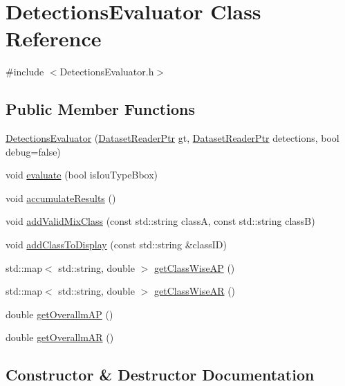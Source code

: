 \hypertarget{class_detections_evaluator}{}\section{Detections\+Evaluator Class Reference}
\label{class_detections_evaluator}


{\ttfamily \#include $<$Detections\+Evaluator.\+h$>$}

\subsection*{Public Member Functions}
\begin{DoxyCompactItemize}
\item 
\hyperlink{class_detections_evaluator_aea7893610a1924fc827b1140f4d64644}{Detections\+Evaluator} (\hyperlink{_dataset_reader_8h_a30d89cba514a220d64d04535c0465f1c}{Dataset\+Reader\+Ptr} gt, \hyperlink{_dataset_reader_8h_a30d89cba514a220d64d04535c0465f1c}{Dataset\+Reader\+Ptr} detections, bool debug=false)
\item 
void \hyperlink{class_detections_evaluator_ae3047c04a1fbdce949f309373f1d81c5}{evaluate} (bool is\+Iou\+Type\+Bbox)
\item 
void \hyperlink{class_detections_evaluator_ae5bd9702b49c12f39d09243b2d00ee74}{accumulate\+Results} ()
\item 
void \hyperlink{class_detections_evaluator_ac71c60dd93e3afdf7ccdc69353afbed7}{add\+Valid\+Mix\+Class} (const std\+::string classA, const std\+::string classB)
\item 
void \hyperlink{class_detections_evaluator_a4dd79b8b2b45a8f035a2ce5d447d5738}{add\+Class\+To\+Display} (const std\+::string \&class\+ID)
\item 
std\+::map$<$ std\+::string, double $>$ \hyperlink{class_detections_evaluator_a8e45b894c4bd12036b06d661b22cfad3}{get\+Class\+Wise\+AP} ()
\item 
std\+::map$<$ std\+::string, double $>$ \hyperlink{class_detections_evaluator_a721ab693346076a18bf7dbdfa9a52c35}{get\+Class\+Wise\+AR} ()
\item 
double \hyperlink{class_detections_evaluator_a593969daae1eb92721cbf6b4d58e480c}{get\+Overallm\+AP} ()
\item 
double \hyperlink{class_detections_evaluator_a33ecd969977924ce1385fc64109e619c}{get\+Overallm\+AR} ()
\end{DoxyCompactItemize}


\subsection{Constructor \& Destructor Documentation}
\mbox{\label{class_detections_evaluator_aea7893610a1924fc827b1140f4d64644}} 
